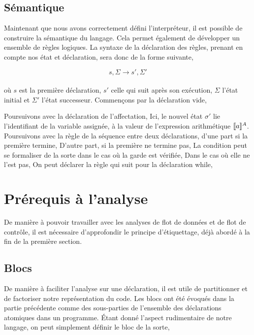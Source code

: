 \documentclass[a4paper, 12pt]{article}
\begin{document}
\subsection{Sémantique}
Maintenant que nous avons correctement défini l'interpréteur, il est possible 
de construire la sémantique du langage. Cela permet également de développer 
un ensemble de règles logiques. La syntaxe de la déclaration des règles,
prenant en compte nos état et déclaration, sera donc de la forme suivante,

\[s, \Sigma \longrightarrow s', \Sigma'\]
\\
où $s$ est la première déclaration, $s'$ celle qui suit après son exécution, 
$\Sigma$ l'état initial et $\Sigma'$  l'état successeur. Commençons 
par la déclaration vide,

\srule{ }{\semanticd{\sskip}{\sigma}{\emptyset}{\sigma}}

Poursuivons avec la déclaration de l'affectation,
Ici, le nouvel état $\sigma'$ lie l'identifiant de la variable assignée, à la 
valeur de l'expression arithmétique $[\![{a}]\!]^{A}$. Poursuivons avec la règle 
de la séquence entre deux déclarations, d'une part si la première termine,
{}
D'autre part, si la première ne termine pas,
{}
La condition peut se formaliser de la sorte dans le cas où la garde est vérifiée,
{}
Dans le cas où elle ne l'est pas,
{}
On peut déclarer la règle qui suit pour la déclaration while,
{}

\section{Prérequis à l'analyse}
De manière à pouvoir travailler avec les analyses de flot de données et de flot de contrôle, 
il est nécessaire d'approfondir le principe d'étiquettage, déjà abordé à la fin de la première section.

\subsection{Blocs}
De manière à faciliter l'analyse sur une déclaration, il est utile de partitionner et de factoriser notre représentation du code. 
Les blocs ont été évoqués dans la partie précédente comme des sous-parties de l'ensemble des déclarations atomiques dans un programme. 
Étant donné l'aspect rudimentaire de notre langage, on peut simplement définir le bloc de la sorte,
\end{document}

